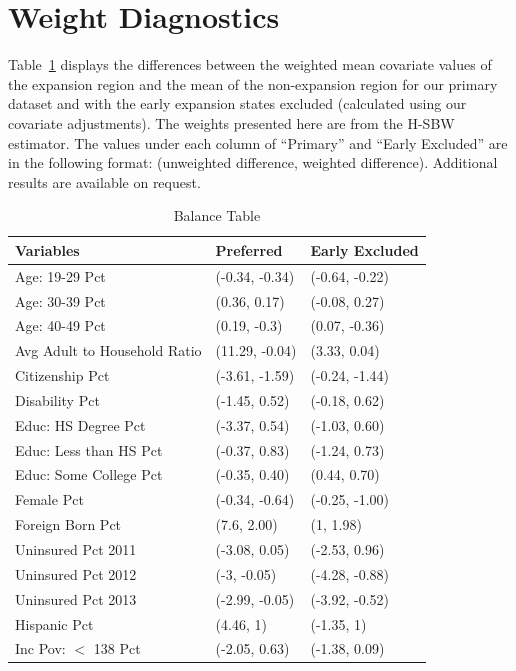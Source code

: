 \section{Weight Diagnostics}
\label{ssec:balancetables}

Table~\ref{tab:baltab1} displays the differences between the weighted mean covariate values of the expansion region and the mean of the non-expansion region for our primary dataset and with the early expansion states excluded (calculated using our covariate adjustments). The weights presented here are from the H-SBW estimator. The values under each column of ``Primary'' and ``Early Excluded'' are in the following format: (unweighted difference, weighted difference). Additional results are available on request.

\begin{table}[h!]
\centering
    \caption{Balance Table}
    \label{tab:baltab1}
\begin{tabular}{lll}
  \hline
Variables & Preferred & Early Excluded \\ 
  \hline
Age: 19-29 Pct & (-0.34, -0.34) & (-0.64, -0.22) \\ 
  Age: 30-39 Pct & (0.36, 0.17) & (-0.08, 0.27) \\ 
  Age: 40-49 Pct & (0.19, -0.3) & (0.07, -0.36) \\ 
  Avg Adult to Household Ratio & (11.29, -0.04) & (3.33, 0.04) \\ 
  Citizenship Pct & (-3.61, -1.59) & (-0.24, -1.44) \\ 
  Disability Pct & (-1.45, 0.52) & (-0.18, 0.62) \\ 
  Educ: HS Degree Pct & (-3.37, 0.54) & (-1.03, 0.60) \\ 
  Educ: Less than HS Pct & (-0.37, 0.83) & (-1.24, 0.73) \\ 
  Educ: Some College Pct & (-0.35, 0.40) & (0.44, 0.70) \\ 
  Female Pct & (-0.34, -0.64) & (-0.25, -1.00) \\ 
  Foreign Born Pct & (7.6, 2.00) & (1, 1.98) \\ 
  Uninsured Pct 2011 & (-3.08, 0.05) & (-2.53, 0.96) \\ 
  Uninsured Pct 2012 & (-3, -0.05) & (-4.28, -0.88) \\ 
  Uninsured Pct 2013 & (-2.99, -0.05) & (-3.92, -0.52) \\ 
  Hispanic Pct & (4.46, 1) & (-1.35, 1) \\ 
  Inc Pov: $<$ 138 Pct & (-2.05, 0.63) & (-1.38, 0.09) \\ 

\end{tabular}
\end{table}

